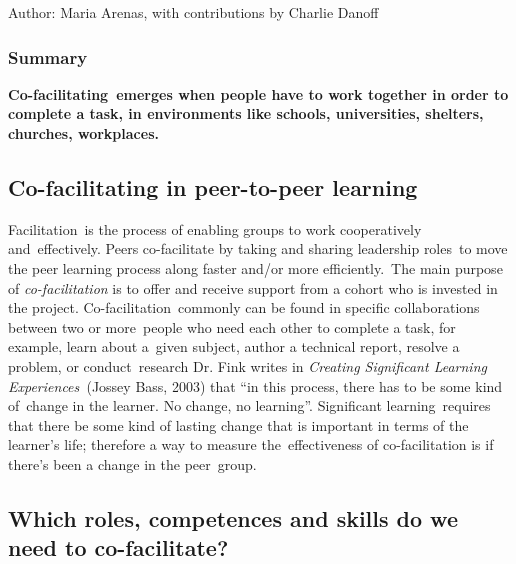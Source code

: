 Author: Maria Arenas, with contributions by Charlie Danoff

\subsubsection{\textbf{Summary}}

\textbf{Co-facilitating~emerges when people have to work together in
order to complete a task, in environments like schools, universities,
shelters, churches, workplaces.}

\subsection{Co-facilitating in peer-to-peer learning}

Facilitation~is the process of enabling groups to work cooperatively
and~effectively. Peers co-facilitate by taking and sharing leadership
roles~to move the peer learning process along faster and/or more
efficiently.~The main purpose of \emph{co-facilitation} is to offer and
receive support from a cohort who is invested in the project.
Co-facilitation~commonly can be found in specific collaborations between
two or more~people who need each other to complete a task, for example,
learn about a~given subject, author a technical report, resolve a
problem, or conduct~research Dr. Fink writes in \emph{Creating
Significant Learning Experiences~}(Jossey Bass, 2003) that ``in this
process, there has to be some kind of~change in the learner. No change,
no learning''. Significant learning~requires that there be some kind of
lasting change that is important in terms of the learner's life;
therefore a way to measure the~effectiveness of co-facilitation is if
there's been a change in the peer~group.

\subsection{Which roles, competences and skills do we need to
co-facilitate?}


